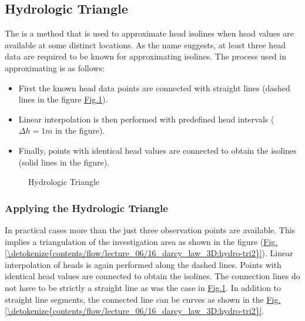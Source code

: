 \documentclass[letterpaper,10pt,english]{sphinxmanual}
\begin{document}
\subsection{Hydrologic Triangle}
\label{\detokenize{contents/flow/lecture_06/16_darcy_law_3D:hydrologic-triangle}}
The  is a method that is used to approximate head isolines when head values are available at some distinct locations. As the name suggests, at least three head data are required to be known for approximating isolines. The process used in approximating is as follows:
\begin{itemize}
\item {} 
First the known head data points are connected with straight lines (dashed lines in the figure \hyperref[\detokenize{contents/flow/lecture_06/16_darcy_law_3D:hydro-tri}]{Fig.\@ \ref{\detokenize{contents/flow/lecture_06/16_darcy_law_3D:hydro-tri}}}).

\item {} 
Linear interpolation is then performed with pre\sphinxhyphen{}defined head intervals (\( \Delta h = 1 m \) in the figure).

\item {} 
Finally, points with identical head values are connected to obtain the isolines (solid lines in the figure).

\end{itemize}

\begin{figure}[htbp]
\centering
\capstart

\noindent{}
\caption{Hydrologic Triangle}\label{\detokenize{contents/flow/lecture_06/16_darcy_law_3D:hydro-tri}}\end{figure}


\subsubsection{Applying the Hydrologic Triangle}
\label{\detokenize{contents/flow/lecture_06/16_darcy_law_3D:applying-the-hydrologic-triangle}}
In practical cases more than the just three observation points are available. This implies a triangulation of the investigation area as shown in the figure (\hyperref[\detokenize{contents/flow/lecture_06/16_darcy_law_3D:hydro-tri2}]{Fig.\@ \ref{\detokenize{contents/flow/lecture_06/16_darcy_law_3D:hydro-tri2}}}). Linear interpolation of heads is again performed along the dashed lines. Points with identical head values are connected to obtain the isolines. The connection lines do not have to be strictly a straight line as was the case in \hyperref[\detokenize{contents/flow/lecture_06/16_darcy_law_3D:hydro-tri}]{Fig.\@ \ref{\detokenize{contents/flow/lecture_06/16_darcy_law_3D:hydro-tri}}}. In addition to straight line segments, the connected line can be  curves as shown in the \hyperref[\detokenize{contents/flow/lecture_06/16_darcy_law_3D:hydro-tri2}]{Fig.\@ \ref{\detokenize{contents/flow/lecture_06/16_darcy_law_3D:hydro-tri2}}}.
\end{document}
